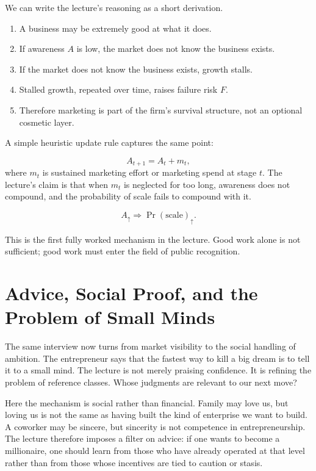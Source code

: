 We can write the lecture's reasoning as a short derivation.

\begin{enumerate}
\item A business may be extremely good at what it does.
\item If awareness \(A\) is low, the market does not know the business exists.
\item If the market does not know the business exists, growth stalls.
\item Stalled growth, repeated over time, raises failure risk \(F\).
\item Therefore marketing is part of the firm's survival structure, not an optional cosmetic layer.
\end{enumerate}

A simple heuristic update rule captures the same point:

\begin{equation}
A_{t+1} = A_t + m_t,
\end{equation}
where \(m_t\) is sustained marketing effort or marketing spend at stage \(t\). The lecture's claim is that when \(m_t\) is neglected for too long, awareness does not compound, and the probability of scale fails to compound with it.

\begin{equation}
A_{\uparrow} \Rightarrow \Pr(\text{scale})_{\uparrow}.
\end{equation}

This is the first fully worked mechanism in the lecture. Good work alone is not sufficient; good work must enter the field of public recognition.

\section{Advice, Social Proof, and the Problem of Small Minds}

The same interview now turns from market visibility to the social handling of ambition. The entrepreneur says that the fastest way to kill a big dream is to tell it to a small mind. The lecture is not merely praising confidence. It is refining the problem of reference classes. Whose judgments are relevant to our next move?

Here the mechanism is social rather than financial. Family may love us, but loving us is not the same as having built the kind of enterprise we want to build. A coworker may be sincere, but sincerity is not competence in entrepreneurship. The lecture therefore imposes a filter on advice: if one wants to become a millionaire, one should learn from those who have already operated at that level rather than from those whose incentives are tied to caution or stasis.

